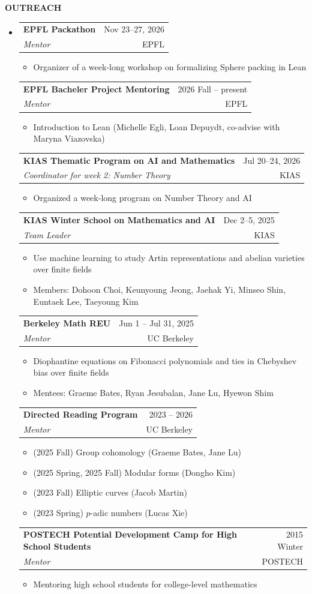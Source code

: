 \documentclass[letterpaper,11pt]{article}
\makeatletter
\newcommand{\resitem}[1]{\item #1}
\newcommand{\resheading}[1]{%
  \par\addvspace{10pt}%
  {\sffamily\bfseries\large\color{accent}\MakeUppercase{#1}}\par\nobreak
  \vspace{2pt}{\color{accent!35}\hrule height 0.7pt}\par\nobreak\vspace{5pt}}
\newcommand{\ressubheading}[4]{%
  \par\addvspace{3pt}%
  \begin{tabular*}{\linewidth}{@{}l@{\extracolsep{\fill}}r@{}}
    \textbf{#1} & {\sffamily\small\color{accent}#4} \\
    \textit{#3} & {\small\color{muted}#2} \\
  \end{tabular*}\par\nobreak\vspace{1pt}}
\makeatother
\begin{document}
\resheading{Outreach}
\begin{itemize} 
	\item[]
	\ressubheading{EPFL Packathon}{EPFL}{Mentor}{Nov 23--27, 2026}
	\begin{itemize}
		\resitem{Organizer of a week-long workshop on formalizing Sphere packing in Lean}
	\end{itemize}

	\ressubheading{EPFL Bacheler Project Mentoring}{EPFL}{Mentor}{2026 Fall -- present}
	\begin{itemize}
		\resitem{Introduction to Lean (Michelle Egli, Loan Depuydt, co-advise with Maryna Viazovska)}
	\end{itemize}

	\ressubheading{KIAS Thematic Program on AI and Mathematics}{KIAS}{Coordinator for week 2: Number Theory}{Jul 20--24, 2026}
	\begin{itemize}
		\item Organized a week-long program on Number Theory and AI
	\end{itemize}

	\ressubheading{KIAS Winter School on Mathematics and AI}{KIAS}{Team Leader}{Dec 2--5, 2025}
	\begin{itemize}
		\resitem{Use machine learning to study Artin representations and abelian varieties over finite fields}
		\resitem{Members: Dohoon Choi, Keunyoung Jeong, Jaehak Yi, Minseo Shin, Euntaek Lee, Taeyoung Kim}
	\end{itemize}

	\ressubheading{Berkeley Math REU}{UC Berkeley}{Mentor}{Jun 1 -- Jul 31, 2025}
	\begin{itemize}
		\resitem{Diophantine equations on Fibonacci polynomials and ties in Chebyshev bias over finite fields}
		\resitem{Mentees: Graeme Bates, Ryan Jesubalan, Jane Lu, Hyewon Shim}
	\end{itemize}

	\ressubheading{Directed Reading Program}{UC Berkeley}{Mentor}{2023 -- 2026}
	\begin{itemize}
		\resitem{(2025 Fall)} Group cohomology (Graeme Bates, Jane Lu)
		\resitem{(2025 Spring, 2025 Fall) Modular forms (Dongho Kim)}
		\resitem{(2023 Fall) Elliptic curves (Jacob Martin)}
		\resitem{(2023 Spring) $p$-adic numbers (Lucas Xie)}
	\end{itemize}

	\ressubheading{POSTECH Potential Development Camp for High School Students}{POSTECH}{Mentor}{2015 Winter}
	\begin{itemize}
		\resitem{Mentoring high school students for college-level mathematics}
	\end{itemize}

\end{itemize}
\end{document}
